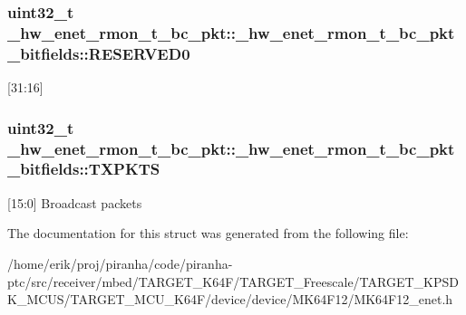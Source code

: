 \subsubsection[{\texorpdfstring{R\+E\+S\+E\+R\+V\+E\+D0}{RESERVED0}}]{\setlength{\rightskip}{0pt plus 5cm}uint32\+\_\+t \+\_\+hw\+\_\+enet\+\_\+rmon\+\_\+t\+\_\+bc\+\_\+pkt\+::\+\_\+hw\+\_\+enet\+\_\+rmon\+\_\+t\+\_\+bc\+\_\+pkt\+\_\+bitfields\+::\+R\+E\+S\+E\+R\+V\+E\+D0}\hypertarget{struct__hw__enet__rmon__t__bc__pkt_1_1__hw__enet__rmon__t__bc__pkt__bitfields_a51e9e6076eac8fe6377a984f1374eb05}{}\label{struct__hw__enet__rmon__t__bc__pkt_1_1__hw__enet__rmon__t__bc__pkt__bitfields_a51e9e6076eac8fe6377a984f1374eb05}
\mbox{[}31\+:16\mbox{]} 
\subsubsection[{\texorpdfstring{T\+X\+P\+K\+TS}{TXPKTS}}]{\setlength{\rightskip}{0pt plus 5cm}uint32\+\_\+t \+\_\+hw\+\_\+enet\+\_\+rmon\+\_\+t\+\_\+bc\+\_\+pkt\+::\+\_\+hw\+\_\+enet\+\_\+rmon\+\_\+t\+\_\+bc\+\_\+pkt\+\_\+bitfields\+::\+T\+X\+P\+K\+TS}\hypertarget{struct__hw__enet__rmon__t__bc__pkt_1_1__hw__enet__rmon__t__bc__pkt__bitfields_af5b5c5e9e5cb081a92763230358b3939}{}\label{struct__hw__enet__rmon__t__bc__pkt_1_1__hw__enet__rmon__t__bc__pkt__bitfields_af5b5c5e9e5cb081a92763230358b3939}
\mbox{[}15\+:0\mbox{]} Broadcast packets 

The documentation for this struct was generated from the following file\+:\begin{DoxyCompactItemize}
\item 
/home/erik/proj/piranha/code/piranha-\/ptc/src/receiver/mbed/\+T\+A\+R\+G\+E\+T\+\_\+\+K64\+F/\+T\+A\+R\+G\+E\+T\+\_\+\+Freescale/\+T\+A\+R\+G\+E\+T\+\_\+\+K\+P\+S\+D\+K\+\_\+\+M\+C\+U\+S/\+T\+A\+R\+G\+E\+T\+\_\+\+M\+C\+U\+\_\+\+K64\+F/device/device/\+M\+K64\+F12/M\+K64\+F12\+\_\+enet.\+h\end{DoxyCompactItemize}
